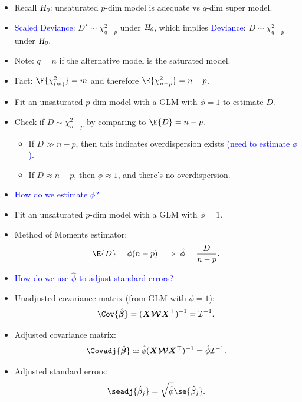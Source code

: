 \documentclass{article}\usepackage[]{graphicx}\usepackage[svgnames]{xcolor}
\newcommand{\HN}{\textsl{H}_{\textsl{0}}}%
\providecommand{\Vector}[1]{\bm{#1}}%
\providecommand{\Matrix}[1]{\bm{#1}}
\providecommand{\MatrixCal}[1]{\bm{\mathcal{#1}}}
\begin{document}
\begin{itemize}
      \item Recall $ \HN $: unsaturated $ p $-dim model is adequate vs $ q $-dim super model.
      \item \textcolor{Blue}{Scaled Deviance}: $ D^\star \sim \chi^2_{q-p} $ under $ \HN $, which implies \textcolor{Blue}{Deviance}: $ D \sim \chi^2_{q-p} $ under $ \HN $.
      \item Note: $ q=n $ if the alternative model is the saturated model.
      \item Fact: $ \E{\chi^2_{(m)}}=m $ and therefore $ \E{\chi^2_{n-p}}=n-p $.
      \item Fit an unsaturated $ p $-dim model with a GLM with $ \phi=1 $ to estimate $ D $.
      \item Check if $ D \sim \chi^2_{n-p} $ by comparing to $ \E{D}=n-p $.
            \begin{itemize}
                  \item If $ D\gg n-p $, then this indicates overdispersion exists \textcolor{Blue}{(need to estimate $ \phi $)}.
                  \item If $ D \approx n-p $, then $ \phi\approx 1 $, and there's no overdispersion.
            \end{itemize}
      \item \textcolor{Blue}{How do we estimate $ \phi $?}
      \item Fit an unsaturated $ p $-dim model with a GLM with $ \phi=1 $.
      \item Method of Moments estimator:
            \[ \E{D}=\phi(n-p)\implies \hat{\phi}=\frac{D}{n-p}. \]
      \item \textcolor{Blue}{How do we use $ \hat{\phi} $ to adjust standard errors?}
      \item Unadjusted covariance matrix (from GLM with $ \phi=1 $):
            \[ \Cov{\hat{\Vector{\beta}}}=(\Matrix{X}\MatrixCal{W}\Matrix{X}^\top)^{-1}=\mathcal{I}^{-1}. \]
      \item Adjusted covariance matrix:
            \[ \Covadj{\hat{\Vector{\beta}}}\simeq \hat{\phi} (\Matrix{X}\MatrixCal{W}\Matrix{X}^\top)^{-1}=\hat{\phi}\mathcal{I}^{-1}. \]
      \item Adjusted standard errors:
            \[ \seadj{\hat{\beta}_j}=\sqrt{\hat{\phi}}\se{\hat{\beta}_j}. \]
\end{itemize}
\end{document}
